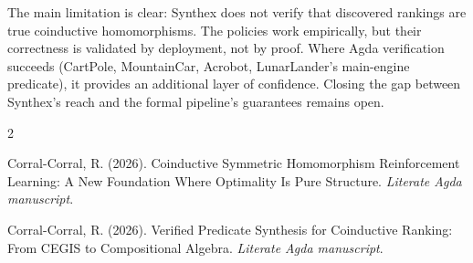 \documentclass[9pt,a4paper]{article}
\theoremstyle{plain}
\theoremstyle{definition}
\theoremstyle{remark}
\begin{document}
The main limitation is clear: Synthex does not verify that
discovered rankings are true coinductive homomorphisms.  The
policies work empirically, but their correctness is validated
by deployment, not by proof.  Where Agda verification succeeds
(CartPole, MountainCar, Acrobot, LunarLander's main-engine
predicate), it provides an additional layer of confidence.
Closing the gap between Synthex's reach and the formal
pipeline's guarantees remains open.

\begin{thebibliography}{2}

Corral-Corral, R. (2026).
Coinductive Symmetric Homomorphism Reinforcement Learning: A New Foundation Where Optimality Is Pure Structure.
\textit{Literate Agda manuscript}.

Corral-Corral, R. (2026).
Verified Predicate Synthesis for Coinductive Ranking: From CEGIS to Compositional Algebra.
\textit{Literate Agda manuscript}.

\end{thebibliography}
\end{document}
